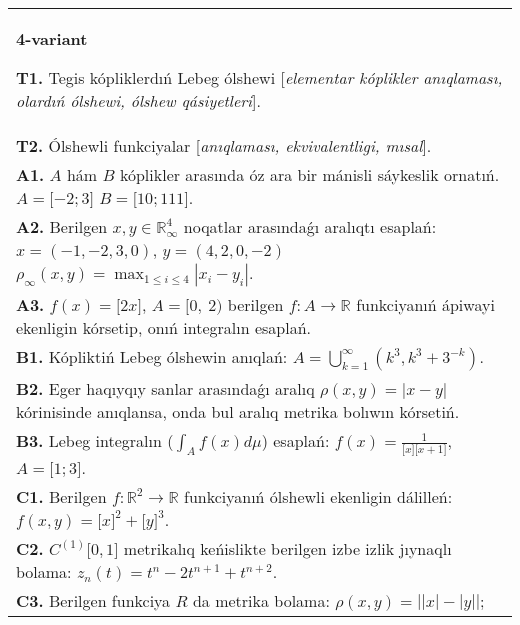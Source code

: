 \documentclass{article}
\begin{document}
\begin{tabular}{m{17cm}}
\textbf{4-variant}
\newline

\textbf{T1.} Tegis kópliklerdıń Lebeg ólshewi [\textit{elementar kóplikler anıqlaması, olardıń ólshewi, ólshew qásiyetleri}]. \\
\textbf{T2.} Ólshewli funkciyalar [\textit{anıqlaması, ekvivalentligi, mısal}]. \\
\textbf{A1.} \(A\) hám \(B\) kóplikler arasında óz ara bir mánisli sáykeslik ornatıń. \(A = \lbrack - 2;3\rbrack\) \(B = \lbrack 10;111\rbrack\). \\
\textbf{A2.} Berilgen \(x,y \in \mathbb{R}_{\infty}^{4}\) noqatlar arasındaǵı aralıqtı esaplań: \(x = ( - 1, - 2,3,0)\), \(y = (4,2,0, - 2)\) \(\rho_{\infty}(x,y) = \max_{1 \leq i \leq 4}\left| x_{i} - y_{i} \right|\). \\
\textbf{A3.} \(f(x) = \lbrack 2x\rbrack\), \(A = \lbrack 0,\ 2)\) berilgen \(f:A\rightarrow\mathbb{R}\) funkciyanıń ápiwayi ekenligin kórsetip, onıń integralın esaplań. \\
\textbf{B1.} Kópliktiń Lebeg ólshewin anıqlań: \(A = \bigcup_{k = 1}^{\infty}\left( k^{3},k^{3} + 3^{- k} \right)\). \\
\textbf{B2.} Eger haqıyqıy sanlar arasındaǵı aralıq \(\rho(x,y) = |x - y|\) kórinisinde anıqlansa, onda bul aralıq metrika bolıwın kórsetiń. \\
\textbf{B3.} Lebeg integralın (\(\int_{A}^{}{f(x)d\mu}\)) esaplań: \(f(x) = \frac{1}{\lbrack x\rbrack\lbrack x + 1\rbrack}\), \(A = \lbrack 1;3\rbrack\). \\
\textbf{C1.} Berilgen \(f:\mathbb{R}^{2}\mathbb{\rightarrow R}\) funkciyanıń ólshewli ekenligin dálilleń: \(f(x,y) = \lbrack x\rbrack^{2} + \lbrack y\rbrack^{3}\). \\
\textbf{C2.} \(C^{(1)}\lbrack 0,1\rbrack\) metrikalıq keńislikte berilgen izbe izlik jıynaqlı bolama: \(z_{n}(t) = t^{n} - 2t^{n + 1} + t^{n + 2}\). \\
\textbf{C3.} Berilgen funkciya \(R\) da metrika bolama: \(\rho(x,y) = \left| |x| - |y| \right|\); \\

\end{tabular}
\vspace{1cm}
\end{document}
